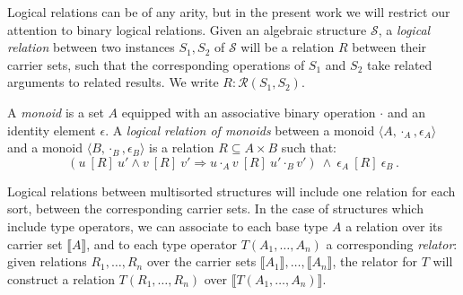 \documentclass[sigplan,10pt,review,anonymous]{acmart}
\newcommand{\ifr}[1]{\ [{#1}]\ }
\begin{document}

Logical relations can be of any arity,
but in the present work
we will restrict our attention to
binary logical relations.
Given an algebraic structure $\mathcal{S}$,
a \emph{logical relation}
between two instances $S_1, S_2$ of $\mathcal{S}$
will be a relation $R$
between their carrier sets,
such that the corresponding operations of $S_1$ and $S_2$
take related arguments to related results.
We write $R : \mathcal{R}(S_1, S_2)$.

\begin{example}
\label{ex:monoid}
A \emph{monoid} is a set $A$ equipped with
an associative binary operation $\cdot$ and
an identity element $\epsilon$.
A \emph{logical relation of monoids} between
a monoid $\langle A, \cdot_A, \epsilon_A \rangle$ and
a monoid $\langle B, \cdot_B, \epsilon_B \rangle$
is a relation $R \subseteq A \times B$
such that:
\[
(u \ifr{R} u' \wedge v \ifr{R} v' \Rightarrow u \cdot_A v \ifr{R} u' \cdot_B
v')
\: \wedge \:
\epsilon_A \ifr{R} \epsilon_B \,.
\]
\end{example}

Logical relations between multisorted structures
will include one relation for each sort,
between the corresponding carrier sets.
In the case of structures which include type operators,
we can associate to each base type $A$
a relation over its carrier set $\llbracket A \rrbracket$,
and to each type operator $T(A_1, \ldots, A_n)$
a corresponding \emph{relator}:
given relations $R_1, \ldots, R_n$ over
the carrier sets $\llbracket A_1 \rrbracket, \ldots, \llbracket A_n \rrbracket$,
the relator for $T$
will construct a relation $T(R_1, \ldots, R_n)$
over $\llbracket T(A_1, \ldots, A_n) \rrbracket$.
\end{document}

